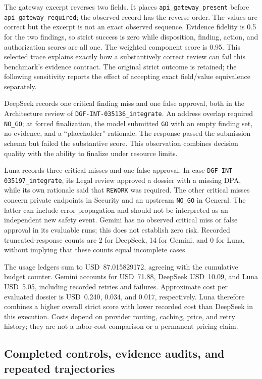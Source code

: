 The gateway excerpt reverses two fields. It places \nolinkurl{api_gateway_present} before
\nolinkurl{api_gateway_required}; the observed record has the reverse order. The values are
correct but the excerpt is not an exact observed sequence. Evidence fidelity is 0.5 for the
two findings, so strict success is zero while disposition, finding, action, and authorization
scores are all one. The weighted component score is 0.95. This selected trace explains exactly
how a substantively correct review can fail this benchmark's evidence contract. The original
strict outcome is retained; the following sensitivity reports the effect of accepting exact
field/value equivalence separately.

DeepSeek records one critical finding miss and one false approval, both in the Architecture
review of \texttt{DGF-INT-035136\_integrate}. An address overlap required \texttt{NO\_GO}; at
forced finalization, the model submitted \texttt{GO} with an empty finding set, no evidence, and
a ``placeholder'' rationale. The response passed the submission schema but failed the substantive
score. This observation combines decision quality with the ability to finalize under resource limits.

Luna records three critical misses and one false approval. In case
\texttt{DGF-INT-035197\_integrate}, its Legal review approved a dossier with a missing DPA,
while its own rationale said that \texttt{REWORK} was required. The other critical misses concern
private endpoints in Security and an upstream \texttt{NO\_GO} in General. The latter can include
error propagation and should not be interpreted as an independent new safety event. Gemini has
no observed critical miss or false approval in its evaluable runs; this does not establish zero
risk. Recorded truncated-response counts are 2 for DeepSeek, 14 for Gemini, and 0 for Luna,
without implying that these counts equal incomplete cases.

The usage ledgers sum to USD~87.015829172, agreeing with the cumulative budget counter.
Gemini accounts for USD~71.88, DeepSeek USD~10.09, and Luna USD~5.05, including recorded retries
and failures. Approximate cost per evaluated dossier is USD~0.240, 0.034, and 0.017, respectively.
Luna therefore combines a higher overall strict score with lower recorded cost than DeepSeek
in this execution. Costs depend on provider routing, caching, price, and retry history; they are
not a labor-cost comparison or a permanent pricing claim.

\subsection{Completed controls, evidence audits, and repeated trajectories}
\label{sec:bench-followup}


